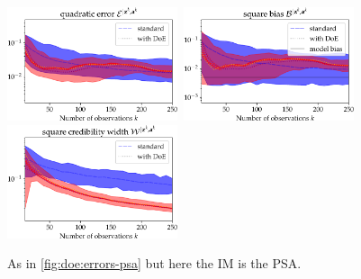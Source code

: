     \begin{figure}[h]
        \centering
        \includegraphics[width=5cm]{figures/DoE/errE_PGA.pdf}\ \includegraphics[width=5cm]{figures/DoE/errB_PGA.pdf}\ \includegraphics[width=5cm]{figures/DoE/errW_PGA.pdf}%
        \caption{As in \cref{fig:doe:errors-psa} but here the IM  is the PSA.}
        \label{fig:doe:errors-pga}
    \end{figure}





